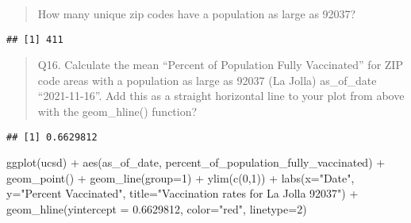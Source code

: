 \documentclass[
]{article}
\newenvironment{Shaded}{\begin{snugshade}}{\end{snugshade}}
\newcommand{\AttributeTok}[1]{\textcolor[rgb]{0.77,0.63,0.00}{#1}}
\newcommand{\DecValTok}[1]{\textcolor[rgb]{0.00,0.00,0.81}{#1}}
\newcommand{\FloatTok}[1]{\textcolor[rgb]{0.00,0.00,0.81}{#1}}
\newcommand{\FunctionTok}[1]{\textcolor[rgb]{0.00,0.00,0.00}{#1}}
\newcommand{\NormalTok}[1]{#1}
\newcommand{\SpecialCharTok}[1]{\textcolor[rgb]{0.00,0.00,0.00}{#1}}
\newcommand{\StringTok}[1]{\textcolor[rgb]{0.31,0.60,0.02}{#1}}
\begin{document}
\begin{quote}
How many unique zip codes have a population as large as 92037?
\end{quote}

\begin{Shaded}
\end{Shaded}

\begin{verbatim}
## [1] 411
\end{verbatim}

\begin{quote}
Q16. Calculate the mean ``Percent of Population Fully Vaccinated'' for
ZIP code areas with a population as large as 92037 (La Jolla)
as\_of\_date ``2021-11-16''. Add this as a straight horizontal line to
your plot from above with the geom\_hline() function?
\end{quote}

\begin{Shaded}
\end{Shaded}

\begin{verbatim}
## [1] 0.6629812
\end{verbatim}

\begin{Shaded}
\begin{Highlighting}[]
\FunctionTok{ggplot}\NormalTok{(ucsd) }\SpecialCharTok{+}
  \FunctionTok{aes}\NormalTok{(as\_of\_date,}
\NormalTok{      percent\_of\_population\_fully\_vaccinated) }\SpecialCharTok{+}
  \FunctionTok{geom\_point}\NormalTok{() }\SpecialCharTok{+}
  \FunctionTok{geom\_line}\NormalTok{(}\AttributeTok{group=}\DecValTok{1}\NormalTok{) }\SpecialCharTok{+}
  \FunctionTok{ylim}\NormalTok{(}\FunctionTok{c}\NormalTok{(}\DecValTok{0}\NormalTok{,}\DecValTok{1}\NormalTok{)) }\SpecialCharTok{+}
  \FunctionTok{labs}\NormalTok{(}\AttributeTok{x=}\StringTok{"Date"}\NormalTok{, }\AttributeTok{y=}\StringTok{"Percent Vaccinated"}\NormalTok{, }\AttributeTok{title=}\StringTok{"Vaccination rates for La Jolla 92037"}\NormalTok{) }\SpecialCharTok{+}
  \FunctionTok{geom\_hline}\NormalTok{(}\AttributeTok{yintercept =} \FloatTok{0.6629812}\NormalTok{, }\AttributeTok{color=}\StringTok{"red"}\NormalTok{, }\AttributeTok{linetype=}\DecValTok{2}\NormalTok{)}
\end{Highlighting}
\end{Shaded}
\end{document}
